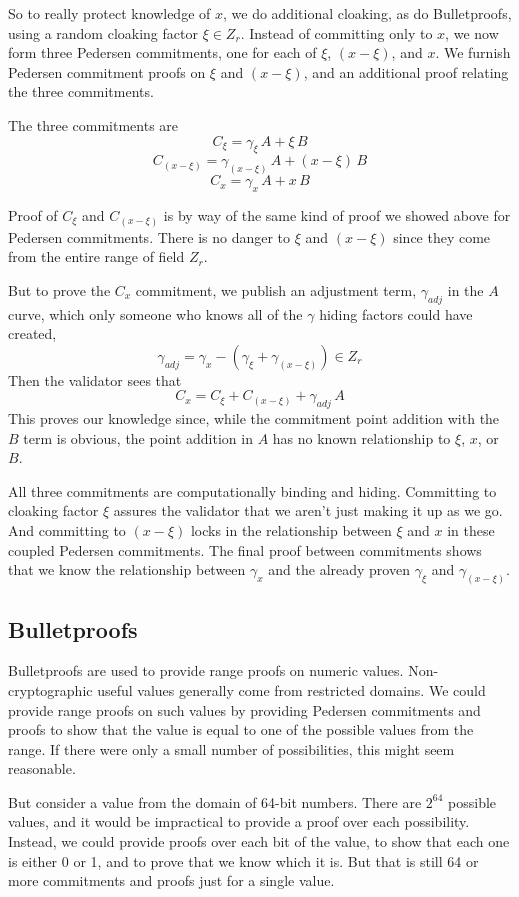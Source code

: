 \documentclass{yellowpaper}
\begin{document}
So to really protect knowledge of $x$, we do additional cloaking, as do Bulletproofs, using a random cloaking factor $\xi \in Z_r$. Instead of committing only to $x$, we now form three Pedersen commitments, one for each of $\xi$, $(x - \xi)$, and $x$. We furnish Pedersen commitment proofs on $\xi$ and $(x-\xi)$, and an additional proof relating the three commitments. 

The three commitments are
$$C_\xi = \gamma_\xi \, A + \xi \, B$$
$$C_{(x-\xi)} = \gamma_{(x-\xi)} \, A + (x - \xi)\, B$$
$$C_x = \gamma_x \, A + x \, B$$

Proof of $C_\xi$ and $C_{(x-\xi)}$ is by way of the same kind of proof we showed above for Pedersen commitments. There is no danger to $\xi$ and $(x - \xi)$ since they come from the entire range of field $Z_r$. 

But to prove the $C_x$ commitment, we publish an adjustment term, $\gamma_{adj}$ in the $A$ curve, which only someone who knows all of the $\gamma$ hiding factors could have created,
$$\gamma_{adj} = \gamma_x - (\gamma_\xi + \gamma_{(x-\xi)}) \in Z_r$$
Then the validator sees that
$$C_x = C_\xi + C_{(x-\xi)} + \gamma_{adj} \, A$$
This proves our knowledge since, while the commitment point addition with the $B$ term is obvious, the point addition in $A$ has no known relationship to $\xi$, $x$, or $B$. 

All three commitments are computationally binding and hiding. Committing to cloaking factor $\xi$ assures the validator that we aren't just making it up as we go. And committing to $(x - \xi)$ locks in the relationship between $\xi$ and $x$ in these coupled Pedersen commitments. The final proof between commitments shows that we know the relationship between $\gamma_x$ and the already proven $\gamma_\xi$ and $\gamma_{(x-\xi)}$. 

\subsection{Bulletproofs}
Bulletproofs are used to provide range proofs on numeric values. Non-cryptographic useful values generally come from restricted domains. We could provide range proofs on such values by providing Pedersen commitments and proofs to show that the value is equal to one of the possible values from the range. If there were only a small number of possibilities, this might seem reasonable.

But consider a value from the domain of 64-bit numbers. There are $2^{64}$ possible values, and it would be impractical to provide a proof over each possibility. Instead, we could provide proofs over each bit of the value, to show that each one is either 0 or 1, and to prove that we know which it is. But that is still 64 or more commitments and proofs just for a single value.
\end{document}
